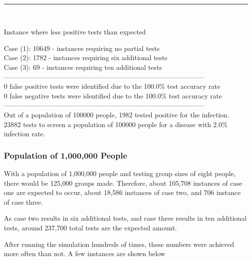 \documentclass[letterpaper, 10pt,DIV=13]{scrartcl}
\numberwithin{equation}{section} %
\numberwithin{figure}{section} %
\numberwithin{table}{section} %
\begin{document}
\\
\begin{center}
\rule{12cm}{.4pt}
\end{center}
\\
\begin{displayquote}
\begin{center}
    Instance where less positive tests than expected
\end{center}
Case (1): 10649 - instances requiring no partial tests\\
Case (2): 1782 - instances requiring six additional tests\\
Case (3): 69 - instances requiring ten additional tests\\
-----------------------------------------------------------------------------------------\\
0 false positive tests were identified due to the 100.0\% test accuracy rate\\
0 false negative tests were identified due to the 100.0\% test accuracy rate\\
-----------------------------------------------------------------------------------------\\
Out of a population of 100000 people, 1982 tested positive for the infection.\\
23882 tests to screen a population of 100000 people for a disease with 2.0\% infection rate.\\
\end{displayquote}


\subsubsection{Population of 1,000,000 People}

With a population of 1,000,000 people and testing group sizes of eight people, there would be 125,000 groups made.  Therefore, about 105,708 instances of case one are expected to occur, about 18,586 instances of case two, and 706 instance of case three.  

As case two results in six additional tests, and case three results in ten additional tests, around 237,700 total tests are the expected amount.

After running the simulation hundreds of times, these numbers were achieved more often than not.  A few instances are shown below
\end{document}

